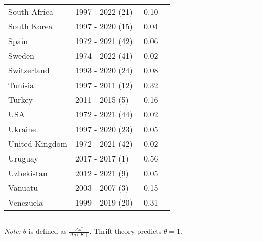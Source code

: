 \begin{table}[H]
{{\begin{tabular}{llrr}
South Africa & 1997 - 2022 (21) & 0.10\\
South Korea & 1997 - 2020 (15) & 0.04\\
Spain & 1972 - 2021 (42) & 0.06\\
\addlinespace
Sweden & 1974 - 2022 (41) & 0.02\\
Switzerland & 1993 - 2020 (24) & 0.08\\
Tunisia & 1997 - 2011 (12) & 0.32\\
Turkey & 2011 - 2015 (5) & -0.16\\
USA & 1972 - 2021 (44) & 0.02\\
\addlinespace
Ukraine & 1997 - 2020 (23) & 0.05\\
United Kingdom & 1972 - 2021 (42) & 0.02\\
Uruguay & 2017 - 2017 (1) & 0.56\\
Uzbekistan & 2012 - 2021 (9) & 0.05\\
Vanuatu & 2003 - 2007 (3) & 0.15\\
\addlinespace
Venezuela & 1999 - 2019 (20) & 0.31\\
\end{tabular}

}

}
\hrule
\label{tbl-indicator_table}
\begin{flushleft}
\footnotesize \emph{Note:} \(\theta\) is defined as \(\frac{\Delta s^*}{\Delta g(K)}\). Thrift theory predicts \(\theta = 1\).
\end{flushleft}
\end{table}